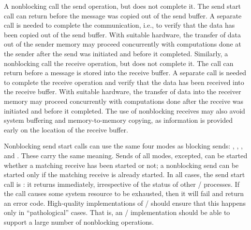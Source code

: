 A nonblocking  call  the send operation, but does not
complete it.  The send start call
can
return before the message was copied out of the send buffer.
A separate 
call is needed to complete the communication, i.e., to verify that the
data has been copied out of the send buffer.  With
suitable hardware, the transfer of data out of the sender memory
may proceed concurrently with computations done at the sender after
the send was initiated and before it completed.
Similarly, a nonblocking  call  the receive
operation, but does not complete it.  The call
can
return before
a message is stored into the receive buffer.  A separate
 call
is needed to complete the receive operation and verify that the data has
been received into the receive buffer.
With suitable hardware, the transfer of data into the receiver memory
may proceed concurrently with computations done after the receive was
initiated and before it completed.  The use of nonblocking receives may also
avoid system buffering and memory-to-memory copying, as information is provided
early on the location of the receive buffer.

Nonblocking send start calls can use the same four modes as blocking sends:
, , , and
.
These carry the same meaning. 
Sends of all modes,  excepted, can be started whether a matching
receive has been started or not; a nonblocking 
send can be started only if
the matching receive is already started.  In all cases, the send start call
is : it returns immediately, irrespective of the
status of other \MPI/ processes.
If the call causes some system resource to be exhausted, then it will
fail and return an error code.  High-quality
implementations of \MPI/ should ensure that this happens only
in ``pathological'' cases.  That is, an \MPI/ implementation
should be able to support a
large number of  nonblocking operations.

